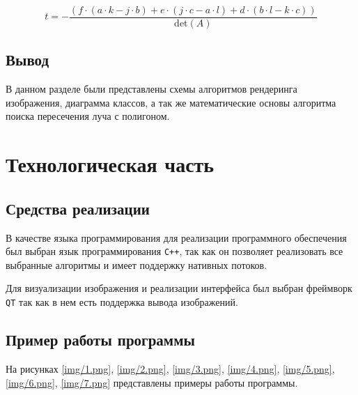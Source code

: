 \begin{equation}
t = - \frac{(f \cdot (a \cdot k - j \cdot b) + e \cdot (j \cdot c - a \cdot l) + d \cdot (b \cdot l - k \cdot c))}{\text{det}(A)}
\label{f14}
\end{equation}

\section{Вывод}
В данном разделе были представлены схемы алгоритмов рендеринга изображения, диаграмма классов, а так же математические основы алгоритма поиска пересечения луча с полигоном.

\chapter{Технологическая часть}
\section{Средства реализации}
В качестве языка программирования для реализации программного
обеспечения был выбран язык программирования \texttt{C++}, так как он позволяет реализовать все выбранные алгоритмы и имеет поддержку нативных потоков.

Для визуализации изображения и реализации интерфейса был выбран фреймворк \texttt{QT} так как в нем есть поддержка вывода изображений.

\section{Пример работы программы}
На рисунках \ref{img/1.png}, \ref{img/2.png}, \ref{img/3.png}, \ref{img/4.png}, \ref{img/5.png}, \ref{img/6.png}, \ref{img/7.png} представлены примеры работы программы.





